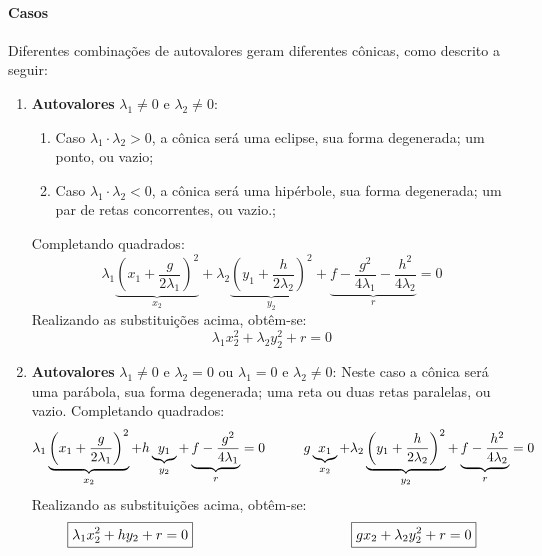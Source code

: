 \documentclass{article}
\begin{document}
            \paragraph{Casos}Diferentes combinações de autovalores geram diferentes cônicas, como descrito a seguir:
                \begin{enumerate}[noitemsep]
                    \item \textbf{Autovalores} $\lambda_{1} \neq 0$ e $\lambda_{2} \neq 0$: 
                        \begin{enumerate}
                            \item Caso $\lambda_{1} \cdot \lambda_{2}>0$, a cônica será uma eclipse, sua forma degenerada; um ponto, ou vazio;
                            \item Caso $\lambda_{1} \cdot \lambda_{2}<0$, a cônica será uma hipérbole, sua forma degenerada; um par de retas concorrentes, ou vazio.;
                        \end{enumerate}
                        Completando quadrados:
                        \[
                            \lambda_{1}\underbrace{\left(x_{1} + \frac{g}{2\lambda_{1}}\right)^2}_{x_{2}} +
                            \lambda_{2}\underbrace{\left(y_{1} + \frac{h}{2\lambda_{2}}\right)^2}_{y_{2}} +
                            \underbrace{f - \frac{g^{2}}{4\lambda_{1}} - \frac{h^{2}}{4\lambda_{2}}}_{r} = 0
                        \]
                    Realizando as substituições acima, obtêm-se:
                        \[
                            \boxed{\lambda_{1}x_{2}^{2} + \lambda_{2}y_{2}^{2} + r = 0}
                        \]
                    \item \textbf{Autovalores} $\lambda_{1} \neq 0$ e $\lambda_{2} = 0$ ou $\lambda_{1} = 0$ e $\lambda_{2} \neq 0$: Neste caso a cônica será uma parábola, sua forma degenerada; uma reta ou duas retas paralelas, ou vazio. Completando quadrados:
                        \[ 
                            \lambda_{1}\underbrace{\left(x_{1} + \frac{g}{2\lambda_{1}}\right)^2}_{x_{2}} + h\underbrace{y_{1}}_{y_{2}} +
                            \underbrace{f - \frac{g^{2}}{4\lambda_{1}}}_{r} = 0
                            \hspace{10mm}
                            g\underbrace{x_{1}}_{x_{2}} + \lambda_{2}\underbrace{\left(y_{1} + \frac{h}{2\lambda_{2}}\right)^2}_{y_{2}} +
                            \underbrace{f - \frac{h^{2}}{4\lambda_{2}}}_{r} = 0
                        \]
                    Realizando as substituições acima, obtêm-se:
                        \[
                            \boxed{\lambda_{1}x_{2}^{2} + h y_{2} + r = 0}
                            \hspace{40mm}
                            \boxed{g x_{2} + \lambda_{2}y_{2}^{2} + r = 0}
                        \]
                \end{enumerate}
\end{document}
